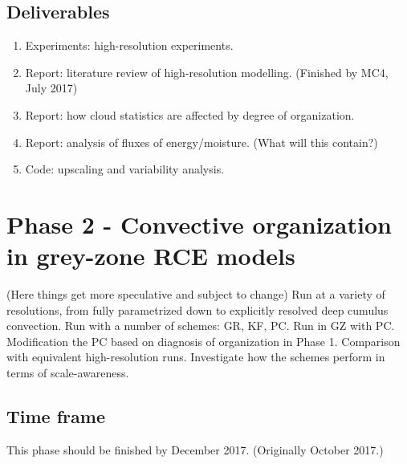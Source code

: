\documentclass[11pt,a4paper]{article}
\begin{document}
\subsection*{Deliverables}
\begin{enumerate}
    \item Experiments: high-resolution experiments.
    \item Report: literature review of high-resolution modelling. (Finished by MC4, July 2017)
    \item Report: how cloud statistics are affected by degree of organization.
    \item Report: analysis of fluxes of energy/moisture. (What will this contain?)
    \item Code: upscaling and variability analysis.
\end{enumerate}

\section*{Phase 2 - Convective organization in grey-zone RCE models}
(Here things get more speculative and subject to change) Run at a variety of resolutions, from fully parametrized down to explicitly resolved deep cumulus convection. Run with a number of schemes: GR, KF, PC. Run in GZ with PC. Modification the PC based on diagnosis of organization in Phase 1. Comparison with equivalent high-resolution runs. Investigate how the schemes perform in terms of scale-awareness.

\subsection*{Time frame}

This phase should be finished by December 2017. (Originally October 2017.)
\end{document}
